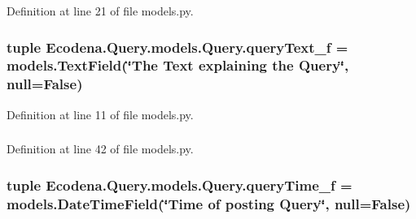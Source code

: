 Definition at line 21 of file models.py.

\hypertarget{class_ecodena_1_1_query_1_1models_1_1_query_a82f008f189f9a40b1bc97147e81ce7ed}{
\subsubsection[{queryText\_\-f}]{\setlength{\rightskip}{0pt plus 5cm}tuple {\bf Ecodena.Query.models.Query.queryText\_\-f} = models.TextField(\char`\"{}The Text explaining the {\bf Query}\char`\"{}, null=False)}}
\label{de/d81/class_ecodena_1_1_query_1_1models_1_1_query_a82f008f189f9a40b1bc97147e81ce7ed}


Definition at line 11 of file models.py.

\hypertarget{class_ecodena_1_1_query_1_1models_1_1_query_af6bf78442af5d30068c5ae9b7f0c48f2}{
\subsubsection[{queryTime\_\-f}]{}}
\label{de/d81/class_ecodena_1_1_query_1_1models_1_1_query_af6bf78442af5d30068c5ae9b7f0c48f2}


Definition at line 42 of file models.py.

\hypertarget{class_ecodena_1_1_query_1_1models_1_1_query_a69b4646a1bbc4d7dc831028df2f80bae}{
\subsubsection[{queryTime\_\-f}]{\setlength{\rightskip}{0pt plus 5cm}tuple {\bf Ecodena.Query.models.Query.queryTime\_\-f} = models.DateTimeField(\char`\"{}Time of posting {\bf Query}\char`\"{}, null=False)}}
\label{de/d81/class_ecodena_1_1_query_1_1models_1_1_query_a69b4646a1bbc4d7dc831028df2f80bae}


